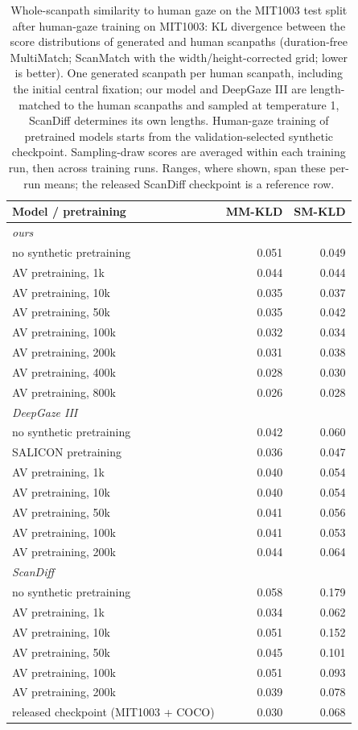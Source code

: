 \begin{table}[t]
  \centering
  \small
  \begin{tabular}{lrr}
    \toprule
    Model / pretraining & MM-KLD & SM-KLD \\
    \midrule
    \multicolumn{3}{l}{\emph{ours}} \\
    no synthetic pretraining & 0.051 & 0.049 \\
    AV pretraining, 1k & 0.044 & 0.044 \\
    AV pretraining, 10k & 0.035 & 0.037 \\
    AV pretraining, 50k & 0.035 & 0.042 \\
    AV pretraining, 100k & 0.032 & 0.034 \\
    AV pretraining, 200k & 0.031 & 0.038 \\
    AV pretraining, 400k & 0.028 & 0.030 \\
    AV pretraining, 800k & 0.026 & 0.028 \\
    \midrule
    \multicolumn{3}{l}{\emph{DeepGaze III}} \\
    no synthetic pretraining & 0.042 & 0.060 \\
    SALICON pretraining & 0.036 & 0.047 \\
    AV pretraining, 1k & 0.040 & 0.054 \\
    AV pretraining, 10k & 0.040 & 0.054 \\
    AV pretraining, 50k & 0.041 & 0.056 \\
    AV pretraining, 100k & 0.041 & 0.053 \\
    AV pretraining, 200k & 0.044 & 0.064 \\
    \midrule
    \multicolumn{3}{l}{\emph{ScanDiff}} \\
    no synthetic pretraining & 0.058 & 0.179 \\
    AV pretraining, 1k & 0.034 & 0.062 \\
    AV pretraining, 10k & 0.051 & 0.152 \\
    AV pretraining, 50k & 0.045 & 0.101 \\
    AV pretraining, 100k & 0.051 & 0.093 \\
    AV pretraining, 200k & 0.039 & 0.078 \\
    \midrule
    released checkpoint (MIT1003 + COCO) & 0.030 & 0.068 \\
    \bottomrule
  \end{tabular}
  \caption{Whole-scanpath similarity to human gaze on the MIT1003 test split after human-gaze training on MIT1003: KL divergence between the score distributions of generated and human scanpaths (duration-free MultiMatch; ScanMatch with the width/height-corrected grid; lower is better). One generated scanpath per human scanpath, including the initial central fixation; our model and DeepGaze III are length-matched to the human scanpaths and sampled at temperature 1, ScanDiff determines its own lengths. Human-gaze training of pretrained models starts from the validation-selected synthetic checkpoint. Sampling-draw scores are averaged within each training run, then across training runs. Ranges, where shown, span these per-run means; the released ScanDiff checkpoint is a reference row.}
  \label{tab:xfam}
\end{table}

